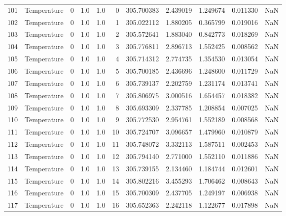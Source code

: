 \begin{tabular}{llrrrrrrrrr}
101 &  Temperature &       0 &  1.0 &  1.0 &    0 &  305.700383 &  2.439019 &  1.249674 &   0.011330 &      NaN \\
102 &  Temperature &       0 &  1.0 &  1.0 &    1 &  305.022112 &  1.880205 &  0.365799 &   0.019016 &      NaN \\
103 &  Temperature &       0 &  1.0 &  1.0 &    2 &  305.572641 &  1.883040 &  0.842773 &   0.018269 &      NaN \\
104 &  Temperature &       0 &  1.0 &  1.0 &    3 &  305.776811 &  2.896713 &  1.552425 &   0.008562 &      NaN \\
105 &  Temperature &       0 &  1.0 &  1.0 &    4 &  305.714312 &  2.774735 &  1.354530 &   0.013054 &      NaN \\
106 &  Temperature &       0 &  1.0 &  1.0 &    5 &  305.700185 &  2.436696 &  1.248600 &   0.011729 &      NaN \\
107 &  Temperature &       0 &  1.0 &  1.0 &    6 &  305.739137 &  2.202759 &  1.231174 &   0.013741 &      NaN \\
108 &  Temperature &       0 &  1.0 &  1.0 &    7 &  305.806975 &  3.000516 &  1.654457 &   0.018382 &      NaN \\
109 &  Temperature &       0 &  1.0 &  1.0 &    8 &  305.693309 &  2.337785 &  1.208854 &   0.007025 &      NaN \\
110 &  Temperature &       0 &  1.0 &  1.0 &    9 &  305.772530 &  2.954761 &  1.552189 &   0.008568 &      NaN \\
111 &  Temperature &       0 &  1.0 &  1.0 &   10 &  305.724707 &  3.096657 &  1.479960 &   0.010879 &      NaN \\
112 &  Temperature &       0 &  1.0 &  1.0 &   11 &  305.748072 &  3.332113 &  1.587511 &   0.002453 &      NaN \\
113 &  Temperature &       0 &  1.0 &  1.0 &   12 &  305.794140 &  2.771000 &  1.552110 &   0.011886 &      NaN \\
114 &  Temperature &       0 &  1.0 &  1.0 &   13 &  305.739155 &  2.134460 &  1.184744 &   0.012601 &      NaN \\
115 &  Temperature &       0 &  1.0 &  1.0 &   14 &  305.802216 &  3.455293 &  1.706462 &   0.008643 &      NaN \\
116 &  Temperature &       0 &  1.0 &  1.0 &   15 &  305.700309 &  2.437705 &  1.249197 &   0.006938 &      NaN \\
117 &  Temperature &       0 &  1.0 &  1.0 &   16 &  305.652363 &  2.242118 &  1.122677 &   0.017898 &      NaN \\

\end{tabular}
